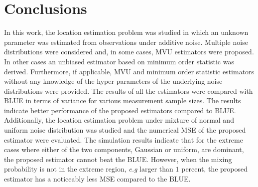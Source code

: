 \documentclass{article}
\begin{document}
\section{Conclusions}\label{sec:conclusions}
In this work, the location estimation problem was studied in which an unknown parameter was estimated from observations under additive noise. Multiple noise distributions were considered and, in some cases, MVU estimators were proposed. In other cases an unbiased estimator based on minimum order statistic was derived. Furthermore, if applicable, MVU and minimum order statistic estimators without any knowledge of the hyper parameters of the underlying noise distributions were provided. The results of all the estimators were compared with BLUE in terms of variance for various measurement sample sizes. The results indicate better performance of the proposed estimators compared to BLUE. Additionally, the location estimation problem under mixture of normal and uniform noise distribution was studied and the numerical MSE of the proposed estimator were evaluated. The simulation results indicate that for the extreme cases where either of the two components, Gaussian or uniform, are dominant, the proposed estimator cannot beat the BLUE. However, when the mixing probability is not in the extreme region, {\em e.g} larger than $1$ percent, the proposed estimator has a noticeably less MSE compared to the BLUE. 

%
%
%


\end{document}
